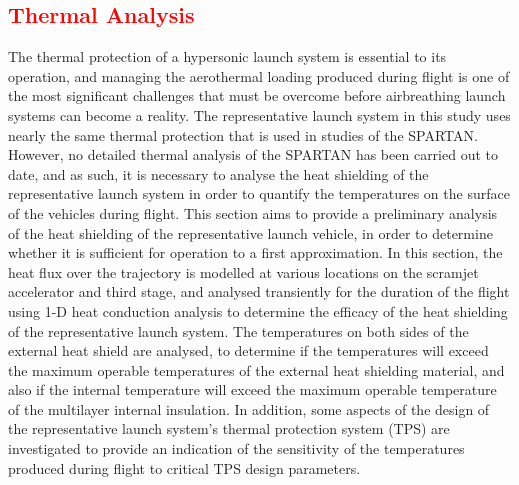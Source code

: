 
\textcolor{red}{
	\chapter{Thermal Analysis}\label{sec:therm}
}

\noindent
The thermal protection of a hypersonic launch system is essential to its operation, and managing the aerothermal loading produced during flight is one of the most significant challenges that must be overcome before airbreathing launch systems can become a reality. The representative launch system in this study uses nearly the same thermal protection that is used in studies of the SPARTAN\cite{Preller2018a}. However, no detailed thermal analysis of the SPARTAN has been carried out to date, and as such, it is necessary to analyse the heat shielding of the representative launch system in order to quantify the temperatures on the surface of the vehicles during flight. This section aims to provide a preliminary analysis of the heat shielding of the representative launch vehicle, in order to determine whether it is sufficient for operation to a first approximation. In this section, the heat flux over the trajectory is modelled at various locations on the scramjet accelerator and third stage, and analysed transiently for the duration of the flight using 1-D heat conduction analysis to determine the efficacy of the heat shielding of the representative launch system. The temperatures on both sides of the external heat shield are analysed, to determine if the temperatures will exceed the maximum operable temperatures of the external heat shielding material, and also if the internal temperature will exceed the maximum operable temperature of the multilayer internal insulation. In addition, some aspects of the design of the representative launch system's thermal protection system (TPS) are investigated to provide an indication of the sensitivity of the temperatures produced during flight to critical TPS design parameters. 





